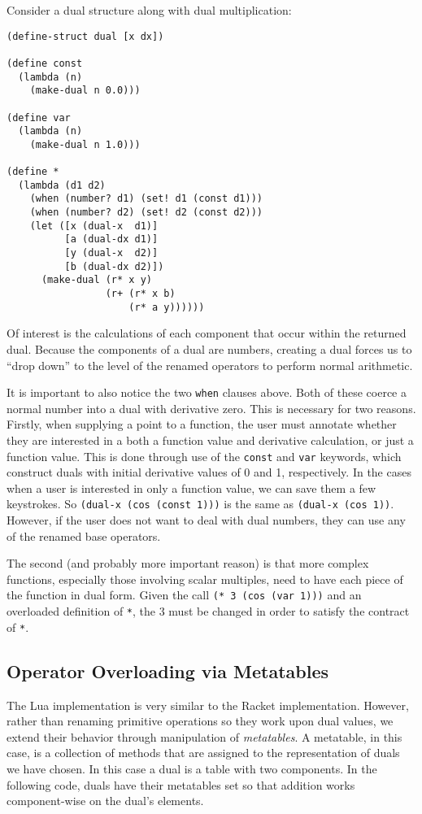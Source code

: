 \documentclass[font=9pt]{article}
\begin{document}
Consider a dual structure along with dual multiplication:
\begin{lstlisting}[basicstyle=\small,
                   captionpos=b,
                   caption={Dual Contstructors and Dual Multiplication in Racket}]
(define-struct dual [x dx])

(define const
  (lambda (n)
    (make-dual n 0.0)))

(define var
  (lambda (n)
    (make-dual n 1.0)))

(define *
  (lambda (d1 d2)
    (when (number? d1) (set! d1 (const d1)))
    (when (number? d2) (set! d2 (const d2)))
    (let ([x (dual-x  d1)]
          [a (dual-dx d1)]
          [y (dual-x  d2)]
          [b (dual-dx d2)])
      (make-dual (r* x y)
                 (r+ (r* x b)
                     (r* a y))))))
\end{lstlisting}

Of interest is the calculations of each component that occur within the returned
dual.  Because the components of a dual are numbers, creating a dual forces us
to ``drop down'' to the level of the renamed operators to perform normal
arithmetic.

It is important to also notice the two \lstinline{when} clauses above.  Both of
these coerce a normal number into a dual with derivative zero.  This is
necessary for two reasons.  Firstly, when supplying a point to a function, the
user must annotate whether they are interested in a both a function value and
derivative calculation, or just a function value.  This is done through use of
the \lstinline{const} and \lstinline{var} keywords, which construct duals with initial
derivative values of 0 and 1, respectively.  In the cases when a user is
interested in only a function value, we can save them a few keystrokes.  So
\lstinline{(dual-x (cos (const 1)))} is the same as \lstinline{(dual-x (cos 1))}.
However, if the user does not want to deal with dual numbers, they can use any
of the renamed base operators.

The second (and probably more important reason) is that more complex functions,
especially those involving scalar multiples, need to have each piece of the
function in dual form.  Given the call \lstinline{(* 3 (cos (var 1)))} and an
overloaded definition of \lstinline{*}, the 3 must be changed in order to
satisfy the contract of \lstinline{*}.

\subsection{Operator Overloading via Metatables}
The Lua implementation is very similar to the Racket implementation.  However,
rather than renaming primitive operations so they work upon dual values, we
extend their behavior through manipulation of \textit{metatables}. A metatable,
in this case, is a collection of methods that are assigned to the representation
of duals we have chosen.  In this case a dual is a table with two components.
In the following code, duals have their metatables set so that addition works
component-wise on the dual's elements.
\end{document}
